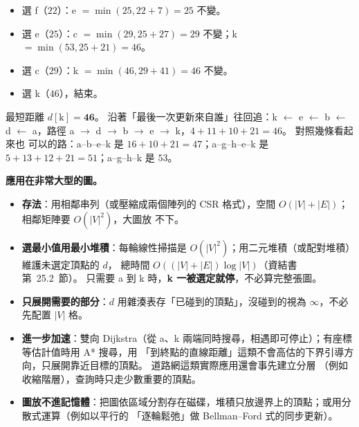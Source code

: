 \begin{pastsoln}
\begin{itemize}
\item 選 f（$22$）：e $= \min(25, 22 + 7) = 25$ 不變。
\item 選 e（$25$）：c $= \min(29, 25 + 27) = 29$ 不變；k $= \min(53, 25 + 21) = 46$。
\item 選 c（$29$）：k $= \min(46, 29 + 41) = 46$ 不變。
\item 選 k（$46$），結束。
\end{itemize}
最短距離 $d[\mathrm{k}] = \mathbf{46}$。 沿著「最後一次更新來自誰」往回追：k $\leftarrow$ e $\leftarrow$ b
$\leftarrow$ d $\leftarrow$ a，路徑 a $\to$ d $\to$ b $\to$ e $\to$ k，$4 + 11 + 10 + 21 = 46$。 對照幾條看起來也
可以的路：a--b--e--k 是 $16 + 10 + 21 = 47$；a--g--h--e--k 是 $5 + 13 + 12 + 21 = 51$；a--g--h--k 是 $53$。

\textbf{應用在非常大型的圖。}
\begin{itemize}
\item \textbf{存法}：用相鄰串列（或壓縮成兩個陣列的 CSR 格式），空間 $O(|V| + |E|)$；相鄰矩陣要 $O(|V|^2)$，大圖放
不下。
\item \textbf{選最小值用最小堆積}：每輪線性掃描是 $O(|V|^2)$；用二元堆積（或配對堆積）維護未選定頂點的 $d$，
總時間 $O((|V| + |E|)\log |V|)$（資結書第~25.2~節）。 只需要 a 到 k 時，\textbf{k 一被選定就停}，不必算完整張圖。
\item \textbf{只展開需要的部分}：$d$ 用雜湊表存「已碰到的頂點」，沒碰到的視為 $\infty$，不必先配置 $|V|$ 格。
\item \textbf{進一步加速}：雙向 Dijkstra（從 a、k 兩端同時搜尋，相遇即可停止）；有座標等估計值時用 A* 搜尋，用
「到終點的直線距離」這類不會高估的下界引導方向，只展開靠近目標的頂點。 道路網這類實際應用還會事先建立分層
（例如收縮階層），查詢時只走少數重要的頂點。
\item \textbf{圖放不進記憶體}：把圖依區域分割存在磁碟，堆積只放邊界上的頂點；或用分散式運算（例如以平行的
「逐輪鬆弛」做 Bellman--Ford 式的同步更新）。
\end{itemize}
\end{pastsoln}
